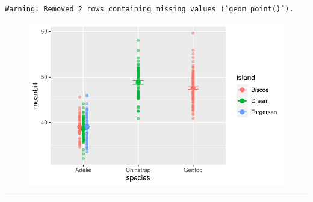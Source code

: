 \documentclass[
  letterpaper,
  DIV=11,
  numbers=noendperiod]{scrartcl}
\begin{document}
\begin{verbatim}
Warning: Removed 2 rows containing missing values (`geom_point()`).
\end{verbatim}

\begin{figure}[H]

{\centering \includegraphics{basic_graphs_files/figure-pdf/unnamed-chunk-21-1.pdf}

}

\end{figure}

\begin{center}\rule{0.5\linewidth}{0.5pt}\end{center}
\end{document}
